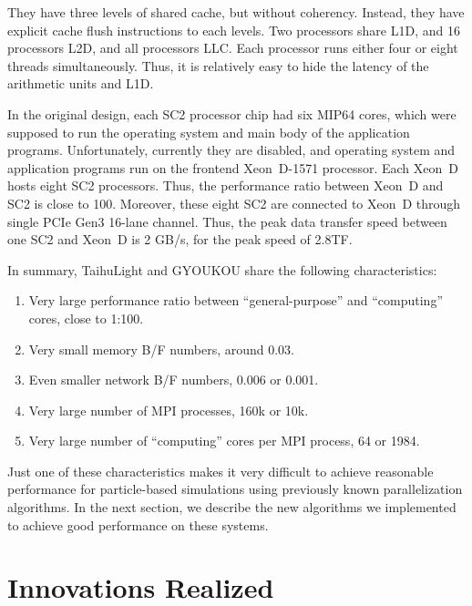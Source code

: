 \documentclass[conference]{IEEEtran}
\begin{document}
They have three levels of shared cache, but without
coherency. Instead, they have explicit cache flush instructions to each
levels. Two processors share L1D, and 16 processors L2D, and all
processors LLC. Each processor runs either four or eight threads
simultaneously. Thus, it is relatively easy to hide the  latency of
the arithmetic units and L1D.

In the original design, each SC2 processor chip had six MIP64 cores,
which were supposed to run the operating system and main body of the
application programs. Unfortunately, currently they are disabled, and
operating system and application programs run on the frontend  Xeon~D-1571
processor. Each Xeon~D  hosts eight SC2 processors. Thus, the
performance ratio between Xeon~D and SC2 is close to 100.
Moreover, these eight SC2 are connected to Xeon~D through single PCIe
Gen3 16-lane channel. Thus, the peak data transfer speed between one
SC2 and Xeon~D is 2 GB/s, for the peak speed of 2.8TF.


%
In summary, TaihuLight and GYOUKOU share the following
characteristics:

\begin{enumerate}



\item Very large performance ratio between ``general-purpose''
  and ``computing'' cores, close to 1:100.
\item  Very small memory  B/F numbers, around 0.03.
\item  Even smaller network B/F numbers, 0.006 or 0.001.
\item Very large number of MPI processes, 160k  or 10k.
\item Very large number of ``computing'' cores per MPI process, 64 or 1984.  
\end{enumerate}

Just one of these characteristics makes it very difficult to achieve
reasonable performance for particle-based simulations using previously
known parallelization algorithms. In the next section, we describe the
new algorithms we implemented to achieve good performance on these systems.



\section{Innovations Realized}
\label{sect:innovation}
\end{document}

